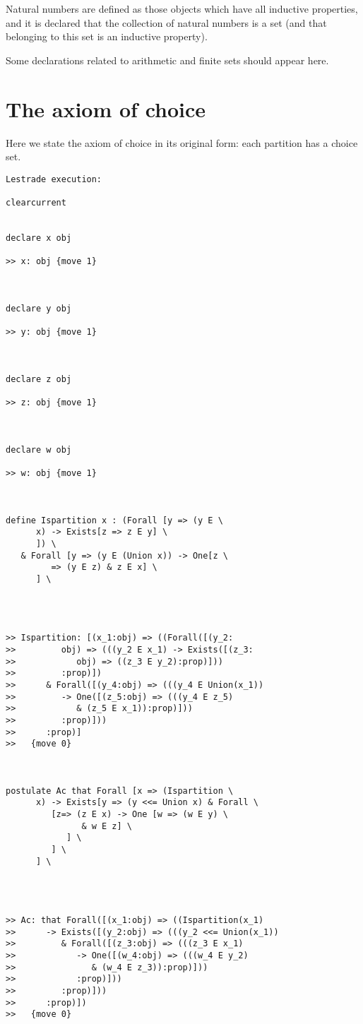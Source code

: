 \documentclass[12pt]{article}
\begin{document}
Natural numbers are defined as those objects which have all inductive properties, and it is declared that the collection of natural numbers is a set (and that belonging to this set
is an inductive property).

Some declarations related to arithmetic and finite sets should appear here.

\section{The axiom of choice}

Here we state the axiom of choice in its original form:  each partition has a choice set.

\begin{verbatim}Lestrade execution:

clearcurrent


declare x obj

>> x: obj {move 1}



declare y obj

>> y: obj {move 1}



declare z obj

>> z: obj {move 1}



declare w obj

>> w: obj {move 1}



define Ispartition x : (Forall [y => (y E \
      x) -> Exists[z => z E y] \
      ]) \
   & Forall [y => (y E (Union x)) -> One[z \
         => (y E z) & z E x] \
      ] \
   



>> Ispartition: [(x_1:obj) => ((Forall([(y_2:
>>         obj) => (((y_2 E x_1) -> Exists([(z_3:
>>            obj) => ((z_3 E y_2):prop)]))
>>         :prop)])
>>      & Forall([(y_4:obj) => (((y_4 E Union(x_1))
>>         -> One([(z_5:obj) => (((y_4 E z_5)
>>            & (z_5 E x_1)):prop)]))
>>         :prop)]))
>>      :prop)]
>>   {move 0}



postulate Ac that Forall [x => (Ispartition \
      x) -> Exists[y => (y <<= Union x) & Forall \
         [z=> (z E x) -> One [w => (w E y) \
               & w E z] \
            ] \
         ] \
      ] \
   



>> Ac: that Forall([(x_1:obj) => ((Ispartition(x_1)
>>      -> Exists([(y_2:obj) => (((y_2 <<= Union(x_1))
>>         & Forall([(z_3:obj) => (((z_3 E x_1)
>>            -> One([(w_4:obj) => (((w_4 E y_2)
>>               & (w_4 E z_3)):prop)]))
>>            :prop)]))
>>         :prop)]))
>>      :prop)])
>>   {move 0}


\end{verbatim}
\end{document}
